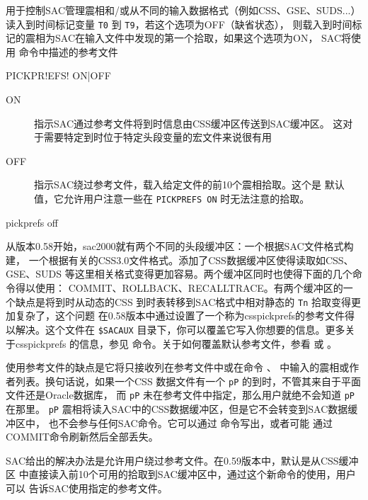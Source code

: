 \label{cmd:pickprefs}

用于控制SAC管理震相和/或从不同的输入数据格式（例如CSS、GSE、SUDS...）
读入到时间标记变量 \texttt{T0} 到 \texttt{T9}，若这个选项为OFF（缺省状态），
则载入到时间标记的震相为SAC在输入文件中发现的第一个拾取，如果这个选项为ON，
SAC将使用  命令中描述的参考文件

\begin{SACSTX}
PICKPR!EFS! ON|OFF
\end{SACSTX}

\begin{description}
\item [ON] 指示SAC通过参考文件将到时信息由CSS缓冲区传送到SAC缓冲区。
    这对于需要特定到时位于特定头段变量的宏文件来说很有用
\item [OFF] 指示SAC绕过参考文件，载入给定文件的前10个震相拾取。这个是
    默认值，它允许用户注意一些在 \texttt{PICKPREFS ON} 时无法注意的拾取。
\end{description}

\begin{SACDFT}
pickprefs off
\end{SACDFT}

从版本0.58开始，sac2000就有两个不同的头段缓冲区：一个根据SAC文件格式构建，
一个根据有关的CSS3.0文件格式。添加了CSS数据缓冲区使得读取如CSS、GSE、SUDS
等这里相关格式变得更加容易。两个缓冲区同时也使得下面的几个命令得以使用：
COMMIT、ROLLBACK、RECALLTRACE。有两个缓冲区的一个缺点是将到时从动态的CSS
到时表转移到SAC格式中相对静态的 \texttt{Tn} 拾取变得更加复杂了，这个问题
在0.58版本中通过设置了一个称为csspickprefs的参考文件得以解决。这个文件在
\verb|$SACAUX| 目录下，你可以覆盖它写入你想要的信息。更多关于csspickprefs
的信息，参见  命令。关于如何覆盖默认参考文件，参看
 或 。

使用参考文件的缺点是它将只接收列在参考文件中或在命令 、
 中输入的震相或作者列表。换句话说，如果一个CSS
数据文件有一个 \texttt{pP} 的到时，不管其来自于平面文件还是Oracle数据库，
而 \texttt{pP} 未在参考文件中指定，那么用户就绝不会知道 \texttt{pP} 在那里。
\texttt{pP} 震相将读入SAC中的CSS数据缓冲区，但是它不会转变到SAC数据缓冲区中，
也不会参与任何SAC命令。它可以通过  命令写出，或者可能
通过COMMIT命令刷新然后全部丢失。

SAC给出的解决办法是允许用户绕过参考文件。在0.59版本中，默认是从CSS缓冲区
中直接读入前10个可用的拾取到SAC缓冲区中，通过这个新命令的使用，用户可以
告诉SAC使用指定的参考文件。
